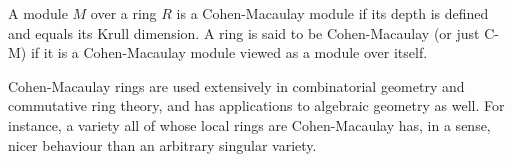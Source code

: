 \documentclass[12pt]{article}
\begin{document}
A module $M$ over a ring $R$ is a Cohen-Macaulay module if its depth is defined and equals its Krull dimension.  A ring is said to be Cohen-Macaulay (or just C-M) if it is a Cohen-Macaulay module viewed as a module over itself.

Cohen-Macaulay rings are used extensively in combinatorial geometry and commutative ring theory, and has applications to algebraic geometry as well.  For instance, a variety all of whose local rings are Cohen-Macaulay has, in a sense, nicer behaviour than an arbitrary singular variety.
\end{document}
